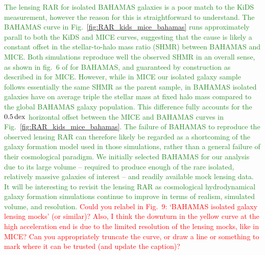 \documentclass[usenatbib]{mnras}
\newcommand{\dex}{\, {\rm dex}}
\begin{document}
\textcolor{ForestGreen}{The lensing RAR for isolated BAHAMAS galaxies is a poor match to the KiDS measurement, however the reason for this is straightforward to understand. The BAHAMAS curve in Fig.~\ref{fig:RAR_kids_mice_bahamas} runs approximately parall to both the KiDS and MICE curves, suggesting that the cause is likely a constant offset in the stellar-to-halo mass ratio (SHMR) between BAHAMAS and MICE. Both simulations reproduce well the observed SHMR in an overall sense, as shown in fig.~6 of \citet{mccarthy2017} for BAHAMAS, and guaranteed by construction as described in \citet{carretero2015} for MICE. However, while in MICE our isolated galaxy sample follows essentially the same SHMR as the parent sample, in BAHAMAS isolated galaxies have on average triple the stellar mass at fixed halo mass compared to the global BAHAMAS galaxy population. This difference fully accounts for the $0.5 \dex$ horizontal offset between the MICE and BAHAMAS curves in Fig.~\ref{fig:RAR_kids_mice_bahamas}. The failure of BAHAMAS to reproduce the observed lensing RAR can therefore likely be regarded as a shortcoming of the galaxy formation model used in those simulations, rather than a general failure of their cosmological paradigm. We initially selected BAHAMAS for our analysis due to its large volume -- required to produce enough of the rare isolated, relatively massive galaxies of interest -- and readily available mock lensing data. It will be interesting to revisit the lensing RAR as cosmological hydrodynamical galaxy formation simulations continue to improve in terms of realism, simulated volume, and resolution.} \textcolor{red}{Could you relabel in Fig.~9: `BAHAMAS isolated galaxy lensing mocks' (or similar)? Also, I think the downturn in the yellow curve at the high acceleration end is due to the limited resolution of the lensing mocks, like in MICE? Can you appropriately truncate the curve, or draw a line or something to mark where it can be trusted (and update the caption)?}
\end{document}
